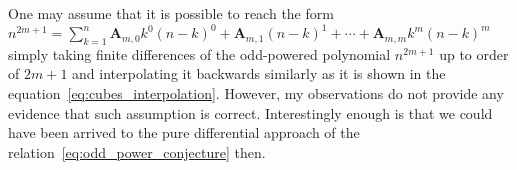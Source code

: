 One may assume that it is possible to reach the form
$n^{2m+1} = \sum_{k=1}^{n} \mathbf{A}_{m,0} k^0 (n-k)^0 + \mathbf{A}_{m,1}(n-k)^1
+ \cdots + \mathbf{A}_{m,m} k^m (n-k)^m$
simply taking finite differences of the odd-powered polynomial $n^{2m+1}$ up to order of $2m+1$
and interpolating it backwards similarly as it is shown in the equation~\eqref{eq:cubes_interpolation}.
However, my observations do not provide any evidence that such assumption is correct.
Interestingly enough is that we could have been arrived to the pure differential
approach of the relation~\eqref{eq:odd_power_conjecture} then.
